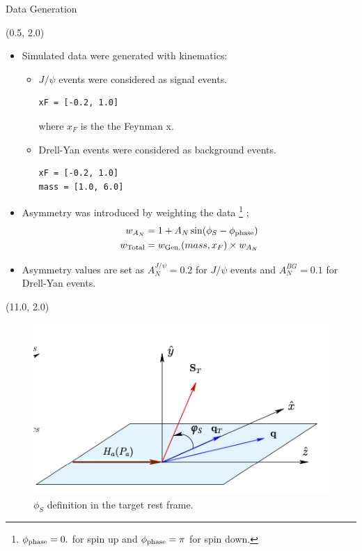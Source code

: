 \documentclass[10pt, xcolor={dvipsnames}, aspectratio = 169]{beamer}
\newcommand{\citeme}[1]{{\tiny \footfullcite{#1}}}
\newcommand{\jpsi}{$J/\psi$ }
\begin{document}
\begin{frame}[fragile]{Data Generation}

\begin{textblock}{14.0}(0.5, 2.0)

\begin{itemize}

\item Simulated data were generated with kinematics:

\begin{itemize}
\item \jpsi events were considered as signal events.

\begin{verbatim}
xF = [-0.2, 1.0]
\end{verbatim}
where $x_{F}$ is the the Feynman x.

\item Drell-Yan events were considered as background events.
\begin{verbatim}
xF = [-0.2, 1.0]
mass = [1.0, 6.0]
\end{verbatim}
\end{itemize}

\item Asymmetry was introduced by weighting the data \footnote{\tiny $\phi_{\rm phase} = 0.$ for spin up and
$\phi_{\rm phase} = \pi$ for spin down.} ;
\begin{align*}
w_{A_{N}} &= 1 + A_{N} \sin(\phi_{S} - \phi_{\rm phase})\\
w_{\text{Total}} &= w_{\text{Gen.}}(mass, x_{F}) \times w_{A_{N}}
\end{align*}

\item Asymmetry values are set as $A_{N}^{J/\psi} = 0.2$ for \jpsi events and $A_{N}^{BG} = 0.1$ for Drell-Yan events.

\end{itemize}
\end{textblock}

\begin{textblock}{5.0}(11.0, 2.0)
\begin{figure}
    \centering
    \includegraphics[width = 5.0 cm]{imgs/phi_angle.png}
    \caption{$\phi_{S}$ definition in the target rest frame.\citeme{Longo:2017snu}}
\end{figure}
\end{textblock}

\end{frame}
\end{document}
